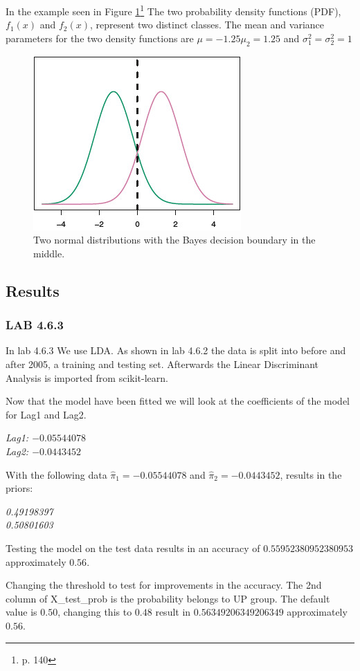 In the example seen in Figure \ref{fig:TwoOneDimensionalNormalDensityFunctions}\footnote{\cite{James2013} p. 140} The two probability density functions (PDF), $f_1(x)$ and $f_2(x)$, represent two distinct classes. The mean and variance parameters for the two density functions are $\mu=-1.25 \mu_2=1.25$ and $\sigma^2_1=\sigma^2_2=1$
\begin{figure}[H]
	\centering
	\includegraphics[scale=2.0]{discriminantAnalysis/linearDiscriminantAnalysis/fig/TwoOneDimensionalNormalDensityFunctions.jpg}
	\caption{Two normal distributions with the Bayes decision boundary in the middle.}
	\label{fig:TwoOneDimensionalNormalDensityFunctions}
\end{figure}


\subsection{Results}
\subsubsection*{LAB 4.6.3}
In lab 4.6.3 We use LDA. As shown in lab 4.6.2 the data is split into before and after 2005, a training and testing set. Afterwards the Linear Discriminant Analysis is imported from scikit-learn.

Now that the model have been fitted we will look at the coefficients of the model for Lag1 and Lag2.

\noindent\textit{Lag1: $-0.05544078$\\
Lag2: $-0.0443452$}

With the following data $\hat{ \pi }_1 = -0.05544078$ and $\hat{ \pi }_2 = -0.0443452 $, results in the priors:%

\noindent\textit{0.49198397\\
0.50801603}

Testing the model on the test data results in an accuracy of $0.55952380952380953$ approximately $0.56$.

Changing the threshold to test for improvements in the accuracy. The 2nd column of X\_test\_prob is the probability belongs to UP group. The default value is $0.50$, changing this to $0.48$ result in $0.56349206349206349$ approximately $0.56$.
